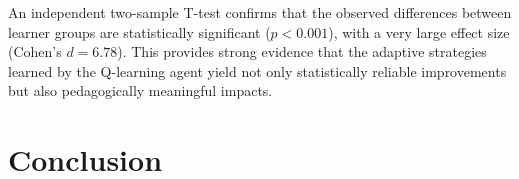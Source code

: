 \documentclass[conference]{IEEEtran}
\begin{document}
An independent two-sample T-test confirms that the observed differences between learner groups are statistically significant ($p < 0.001$), with a very large effect size (Cohen’s $d = 6.78$). This provides strong evidence that the adaptive strategies learned by the Q-learning agent yield not only statistically reliable improvements but also pedagogically meaningful impacts.

\section{Conclusion}
\label{sec:conclusion}




\end{document}
